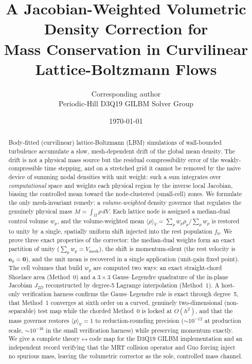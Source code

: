 \documentclass[11pt]{article}
\title{A Jacobian-Weighted Volumetric Density Correction for\\
       Mass Conservation in Curvilinear Lattice-Boltzmann Flows}
\author{%
  Corresponding author\\
  \small Periodic-Hill D3Q19 GILBM Solver Group
}
\date{\today}
\theoremstyle{definition}
\theoremstyle{remark}
\begin{document}
\maketitle

\begin{abstract}
\noindent
Body-fitted (curvilinear) lattice-Boltzmann (LBM) simulations of wall-bounded
turbulence accumulate a slow, mesh-dependent drift of the global mean density.
The drift is not a physical mass source but the residual compressibility error
of the weakly-compressible time stepping, and on a stretched grid it cannot be
removed by the naive device of summing nodal densities with unit weight: such a
sum integrates over \emph{computational} space and weights each physical region
by the inverse local Jacobian, biasing the controlled mean toward the
node-clustered (small-cell) zones. We formulate the only mesh-invariant remedy:
a \emph{volume-weighted} density governor that regulates the genuinely physical
mass $M=\int_\Omega\rho\,dV$. Each lattice node is assigned a median-dual
control volume $w_p$, and the volume-weighted mean
$\langle\rho\rangle_V=\sum_p w_p\rho_p/\sum_p w_p$ is restored to unity by a
single, spatially uniform shift injected into the rest population $f_0$. We prove
three exact properties of the corrector: the median-dual weights form an exact
partition of unity ($\sum_p w_p=V_{\mathrm{mesh}}$), the shift is
momentum-silent (the rest velocity is $\mathbf e_0=\mathbf0$), and the unit mean
is recovered in a single application (unit-gain fixed point). The cell volumes
that build $w_p$ are computed two ways: an exact straight-chord Shoelace area
(Method~0) and a $3\times3$ Gauss--Legendre quadrature of the in-plane Jacobian
$J_{2D}$ reconstructed by degree-5 Lagrange interpolation (Method~1). A
host-only verification harness confirms the Gauss--Legendre rule is exact through
degree~5, that Method~1 converges at sixth order on a curved, genuinely
two-dimensional (non-separable) test map while the chorded Method~0 is locked at
$O(h^2)$, and that the mass
governor restores $\langle\rho\rangle_V=1$ to reduction-rounding precision
($\sim\!10^{-12}$ at production scale, $\sim\!10^{-16}$ in the small verification
harness) while preserving momentum exactly. We give a complete
theory$\leftrightarrow$code map for the D3Q19 GILBM implementation and an
independent record verifying that the MRT collision operator and Guo forcing
inject no spurious mass, leaving the volumetric corrector as the sole, controlled
mass channel.
\end{abstract}
\end{document}

